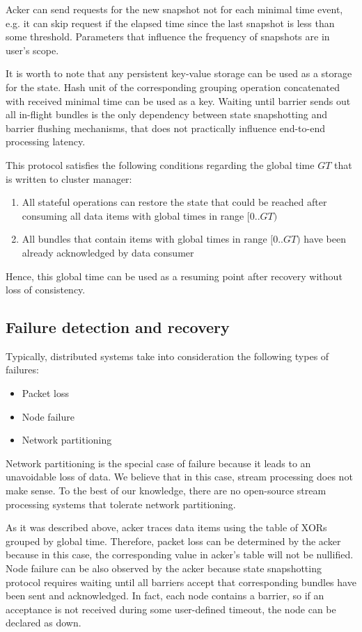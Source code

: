 Acker can send requests for the new snapshot not for each minimal time event, e.g. it can skip request if the elapsed time since the last snapshot is less than some threshold. Parameters that influence the frequency of snapshots are in user's scope.

It is worth to note that any persistent key-value storage can be used as a storage for the state. Hash unit of the corresponding grouping operation concatenated with received minimal time can be used as a key. Waiting until barrier sends out all in-flight bundles is the only dependency between state snapshotting and barrier flushing mechanisms, that does not practically influence end-to-end processing latency. 

This protocol satisfies the following conditions regarding the global time $GT$ that is written to cluster manager:
\begin{enumerate}
    \item All stateful operations can restore the state that could be reached after consuming all data items with global times in range $[0..GT)$ 
    \item All bundles that contain items with global times in range $[0..GT)$ have been already acknowledged by data consumer 
\end{enumerate}

Hence, this global time can be used as a resuming point after recovery without loss of consistency.

\subsection{Failure detection and recovery}
Typically, distributed systems take into consideration the following types of failures:
\begin{itemize}
    \item Packet loss
    \item Node failure
    \item Network partitioning
\end{itemize}

Network partitioning is the special case of failure because it leads to an unavoidable loss of data. We believe that in this case, stream processing does not make sense. To the best of our knowledge, there are no open-source stream processing systems that tolerate network partitioning.

As it was described above, acker traces data items using the table of XORs grouped by global time. Therefore, packet loss can be determined by the acker because in this case, the corresponding value in acker's table will not be nullified. Node failure can be also observed by the acker because state snapshotting protocol requires waiting until all barriers accept that corresponding bundles have been sent and acknowledged. In fact, each node contains a barrier, so if an acceptance is not received during some user-defined timeout, the node can be declared as down. 

